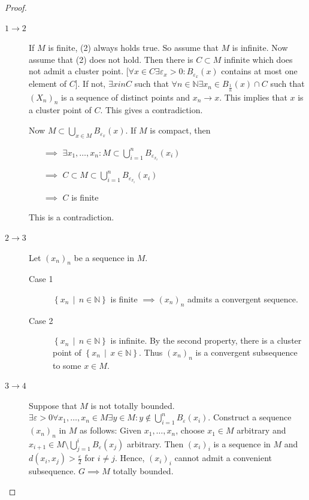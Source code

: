 \documentclass[a4paper]{article}
\numberwithin{lecref}{section}
\newcommand{\SetDef}[2]{\left\{#1\,\mid\,#2\right\}}
\begin{document}
\begin{proof}
	\begin{description}
		\item[$1 \to 2$]
			If $M$ is finite, (2) always holds true.
			So assume that $M$ is infinite. Now assume that (2) does not hold.
			Then there is $C \subset M$ infinite which does not admit a cluster point.
			[$\forall x \in C \exists \varepsilon_x > 0: B_{\varepsilon_x}(x)$ contains at most one element of $C$].
			If not, $\exists x in C$ such that $\forall n \in \mathbb N \exists x_n \in B_{\frac1n}(x) \cap C$ such that $(X_n)_n$ is a sequence of distinct points and $x_n \to x$.
			This implies that $x$ is a cluster point of $C$. This gives a contradiction.

			Now $M \subset \bigcup_{x \in M} B_{\varepsilon_x}(x)$. If $M$ is compact, then
			\begin{enumerate}
				\item[$\implies$] $\exists x_1, \dots, x_n: M \subset \bigcup_{i=1}^n B_{\varepsilon_{x_i}}(x_i)$
				\item[$\implies$] $C \subset M \subset \bigcup_{i=1}^n B_{\varepsilon_{x_i}}(x_i)$
				\item[$\implies$] $C$ is finite
			\end{enumerate}
			This is a contradiction.
		\item[$2 \to 3$]
			Let $(x_n)_n$ be a sequence in $M$.
			\begin{description}
				\item[Case 1]
					$\SetDef{x_n}{n \in \mathbb N}$ is finite $\implies (x_n)_n$ admits a convergent sequence.
				\item[Case 2]
					$\SetDef{x_n}{n \in \mathbb N}$ is infinite.
					By the second property, there is a cluster point of $\SetDef{x_n}{x \in \mathbb N}$.
					Thus $(x_n)_n$ is a convergent subsequence to some $x \in M$.
			\end{description}
		\item[$3 \to 4$]
			Suppose that $M$ is not totally bounded. $\exists \varepsilon > 0 \forall x_1, \dots, x_n \in M \exists y \in M: y \not\in \bigcup_{i = 1}^n B_{\varepsilon}(x_i)$.
			Construct a sequence $(x_n)_n$ in $M$ as follows:
			Given $x_1, \dots, x_n$, choose $x_1 \in M$ arbitrary and $x_{i+1} \in M \setminus \bigcup_{j=1}^i B_{\varepsilon}(x_j)$ arbitrary.
			Then $(x_i)_i$ is a sequence in $M$ and $d(x_i, x_j) > \frac\varepsilon2$ for $i \neq j$.
			Hence, $(x_i)_i$ cannot admit a convenient subsequence. $G \implies M$ totally bounded.


\end{description}
\end{proof}
\end{document}
